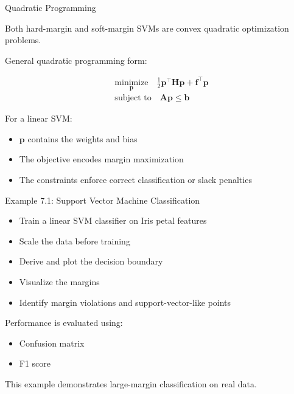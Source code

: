 \documentclass[aspectratio=169]{beamer}
\begin{document}

\begin{frame}{Quadratic Programming}

Both hard-margin and soft-margin SVMs are convex quadratic optimization problems.

\vspace{0.5em}

General quadratic programming form:

\[
\begin{split}
& \underset{\mathbf{p}}{\text{minimize}}
\quad
\frac{1}{2}\mathbf{p}^{\top}\mathbf{H}\mathbf{p}
+
\mathbf{f}^{\top}\mathbf{p}
\\
& \text{subject to}
\quad
\mathbf{A}\mathbf{p}\le \mathbf{b}
\end{split}
\]

\vspace{0.5em}

For a linear SVM:

\begin{itemize}
\item \(\mathbf{p}\) contains the weights and bias
\item The objective encodes margin maximization
\item The constraints enforce correct classification or slack penalties
\end{itemize}

\end{frame}


\begin{frame}{Example 7.1: Support Vector Machine Classification}

\begin{itemize}
\item Train a linear SVM classifier on Iris petal features
\item Scale the data before training
\item Derive and plot the decision boundary
\item Visualize the margins
\item Identify margin violations and support-vector-like points
\end{itemize}

\vspace{0.5em}

Performance is evaluated using:

\begin{itemize}
\item Confusion matrix
\item F1 score
\end{itemize}

\vspace{0.5em}

This example demonstrates large-margin classification on real data.

\end{frame}
\end{document}
